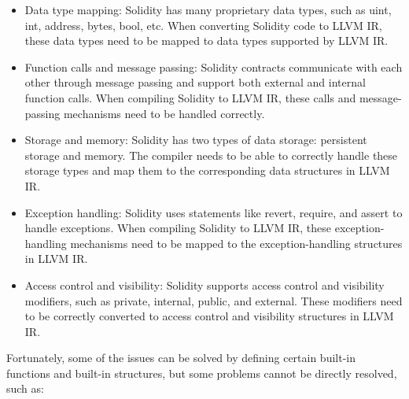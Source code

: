 \begin{itemize}
    \item Data type mapping: Solidity has many proprietary data types, such as uint, int, address, bytes, bool, etc. When converting Solidity code to LLVM IR, these data types need to be mapped to data types supported by LLVM IR.

    \item Function calls and message passing: Solidity contracts communicate with each other through message passing and support both external and internal function calls. When compiling Solidity to LLVM IR, these calls and message-passing mechanisms need to be handled correctly.

    \item Storage and memory: Solidity has two types of data storage: persistent storage and memory. The compiler needs to be able to correctly handle these storage types and map them to the corresponding data structures in LLVM IR.

    \item Exception handling: Solidity uses statements like revert, require, and assert to handle exceptions. When compiling Solidity to LLVM IR, these exception-handling mechanisms need to be mapped to the exception-handling structures in LLVM IR.

    \item Access control and visibility: Solidity supports access control and visibility modifiers, such as private, internal, public, and external. These modifiers need to be correctly converted to access control and visibility structures in LLVM IR.
\end{itemize}

Fortunately, some of the issues can be solved by defining certain built-in functions and built-in structures, but some problems cannot be directly resolved, such as:


